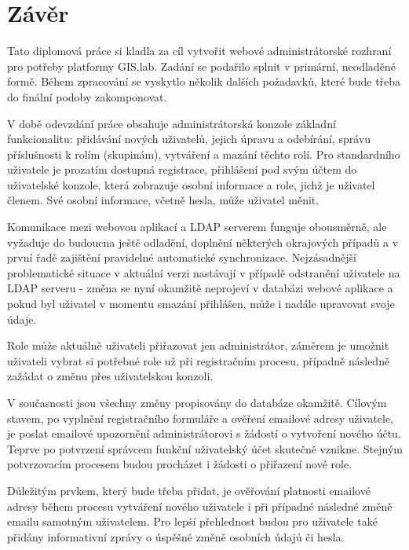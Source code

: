 \chapter{Závěr}
\label{5-zaver}


Tato diplomová práce si kladla za cíl vytvořit webové administrátorské rozhraní pro potřeby platformy GIS.lab. Zadání se podařilo splnit v primární, neodladěné formě. Během zpracování se vyskytlo několik dalších požadavků, které bude třeba do finální podoby zakomponovat.

V době odevzdání práce obsahuje administrátorská konzole základní funkcionalitu: přidávání nových uživatelů, jejich úpravu a odebírání, správu příslušnosti k rolím (skupinám), vytváření a mazání těchto rolí. Pro standardního uživatele je prozatím dostupná registrace, přihlášení pod svým účtem do uživatelské konzole, která zobrazuje osobní informace a role, jichž je uživatel členem. Své osobní informace, včetně hesla, může uživatel měnit. 

Komunikace mezi webovou aplikací a LDAP serverem funguje obousměrně, ale vyžaduje do budoucna ještě odladění, doplnění některých okrajových případů a v první řadě zajištění pravidelné automatické synchronizace. Nejzásadnější problematické situace v aktuální verzi nastávají v případě odstranění uživatele na LDAP serveru - změna se nyní okamžitě neprojeví v databázi webové aplikace a pokud byl uživatel v momentu smazání přihlášen, může i nadále upravovat svoje údaje.

Role může aktuálně uživateli přiřazovat jen administrátor, záměrem je umožnit uživateli vybrat si potřebné role už při registračním procesu, případně následně zažádat o změnu přes uživatelskou konzoli.

V současnosti jsou všechny změny propisovány do databáze okamžitě. Cílovým stavem, po vyplnění registračního formuláře a ověření emailové adresy uživatele, je poslat emailové upozornění administrátorovi s žádostí o vytvoření nového účtu. Teprve po potvrzení správcem funkční uživatelský účet skutečně vznikne. Stejným potvrzovacím procesem budou procházet i žádosti o přiřazení nové role.

Důležitým prvkem, který bude třeba přidat, je ověřování platnosti emailové adresy během procesu vytváření nového uživatele i při případné následné změně emailu samotným uživatelem. Pro lepší přehlednost budou pro uživatele také přidány informativní zprávy o úspěšné změně osobních údajů či hesla.

